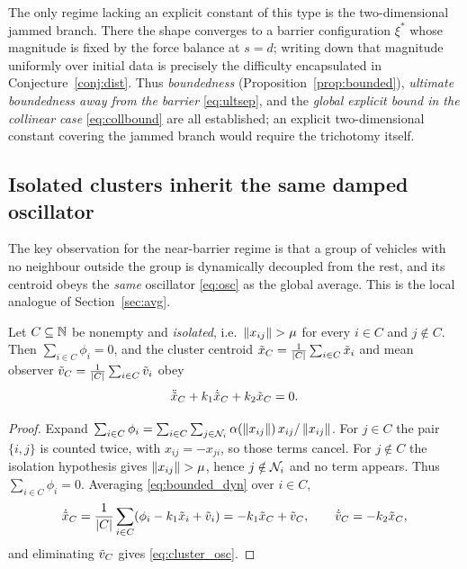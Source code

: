 The only regime lacking an explicit constant of this type is the two-dimensional jammed branch. There
the shape converges to a barrier configuration $\xi^*$ whose magnitude is fixed by the force balance
at $s=d$; writing down that magnitude uniformly over initial data is precisely the difficulty
encapsulated in Conjecture~\ref{conj:dist}. Thus \emph{boundedness} (Proposition~\ref{prop:bounded}),
\emph{ultimate boundedness away from the barrier} \eqref{eq:ultsep}, and the \emph{global explicit
bound in the collinear case} \eqref{eq:collbound} are all established; an explicit two-dimensional
constant covering the jammed branch would require the trichotomy itself.

\subsection{Isolated clusters inherit the same damped oscillator}
\label{sec:cluster}

The key observation for the near-barrier regime is that a group of vehicles with no neighbour
outside the group is dynamically decoupled from the rest, and its centroid obeys the \emph{same}
oscillator \eqref{eq:osc} as the global average. This is the local analogue of Section~\ref{sec:avg}.

\begin{lemma}\label{lem:cluster}
Let $C\subseteq\mathbb{N}$ be nonempty and \emph{isolated}, i.e.\ $\norm{x_{ij}}>\mu$ for every
$i\in C$ and $j\notin C$. Then $\sum_{i\in C}\phi_i=0$, and the cluster centroid
$\tilde{x}_C=\frac{1}{|C|}\sum_{i\in C}\tilde{x}_i$ and mean observer
$\tilde{v}_C=\frac{1}{|C|}\sum_{i\in C}\tilde{v}_i$ obey
\begin{equation}
  \ddot{\tilde{x}}_C+k_1\dot{\tilde{x}}_C+k_2\tilde{x}_C=0 .
  \label{eq:cluster_osc}
\end{equation}
\end{lemma}

\begin{proof}
Expand
$\sum_{i\in C}\phi_i=\sum_{i\in C}\sum_{j\in\mathcal{N}_i}\alpha(\left\| x_{ij} \right\|)\,x_{ij}/\left\| x_{ij} \right\|$.
For $j\in C$ the pair $\{i,j\}$ is counted twice, with $x_{ij}=-x_{ji}$, so those terms cancel. For
$j\notin C$ the isolation hypothesis gives $\norm{x_{ij}}>\mu$, hence $j\notin\mathcal{N}_i$ and no term
appears. Thus $\sum_{i\in C}\phi_i=0$. Averaging \eqref{eq:bounded_dyn} over $i\in C$,
\begin{equation}
  \dot{\tilde{x}}_C=\frac{1}{|C|}\sum_{i\in C}(\phi_i-k_1\tilde{x}_i+\tilde{v}_i)=-k_1\tilde{x}_C+\tilde{v}_C,
  \qquad
  \dot{\tilde{v}}_C=-k_2\tilde{x}_C ,
\end{equation}
and eliminating $\tilde{v}_C$ gives \eqref{eq:cluster_osc}.
\end{proof}

